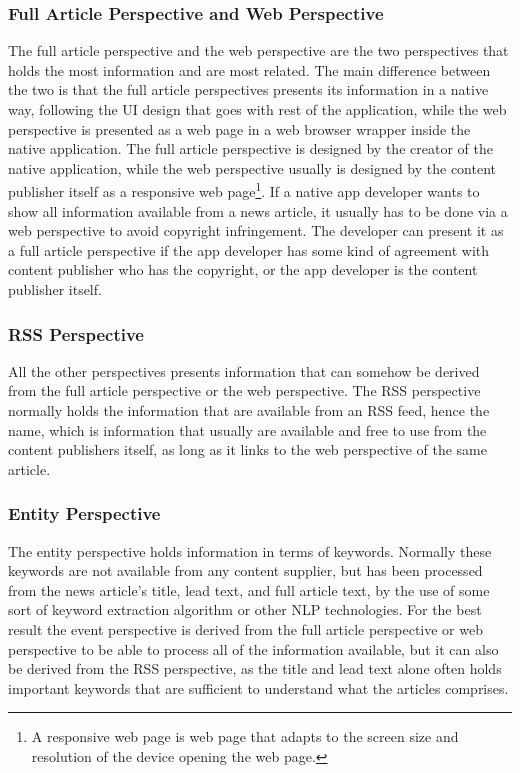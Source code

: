 \subsubsection{Full Article Perspective and Web Perspective}
The full article perspective and the web perspective are the two perspectives that holds the most information and are most related. The main difference between the two is that the full article perspectives presents its information in a native way, following the UI design that goes with rest of the application, while the web perspective is presented as a web page in a web browser wrapper inside the native application. The full article perspective is designed by the creator of the native application, while the web perspective usually is designed by the content publisher itself as a responsive web page\footnote{A responsive web page is web page that adapts to the screen size and resolution of the device opening the web page.}. If a native app developer wants to show all information available from a news article, it usually has to be done via a web perspective to avoid copyright infringement. The developer can present it as a full article perspective if the app developer has some kind of agreement with content publisher who has the copyright, or the app developer is the content publisher itself.

\subsubsection{RSS Perspective}
All the other perspectives presents information that can somehow be derived from the full article perspective or the web perspective. The RSS perspective normally holds the information that are available from an RSS feed, hence the name, which is information that usually are available and free to use from the content publishers itself, as long as it links to the web perspective of the same article.

\subsubsection{Entity Perspective}
The entity perspective holds information in terms of keywords. Normally these keywords are not available from any content supplier, but has been processed from the news article's title, lead text, and full article text, by the use of some sort of keyword extraction algorithm or other NLP technologies. For the best result the event perspective is derived from the full article perspective or web perspective to be able to process all of the information available, but it can also be derived from the RSS perspective, as the title and lead text alone often holds important keywords that are sufficient to understand what the articles comprises.

